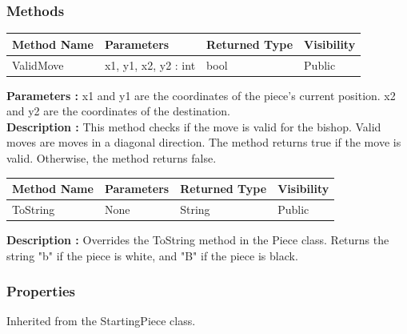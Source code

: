 \documentclass[12pt]{article}
\begin{document}
    \subsubsection{Methods}

    \begin{table}[H]
        \begin{tabular}{|l|l|l|l|}
            \hline
            \rowcolor[HTML]{EFEFEF}
            \cellcolor[HTML]{EFEFEF}\textbf{Method Name} & \textbf{Parameters}  & \textbf{Returned Type} & \textbf{Visibility} \\ \hline
            ValidMove                                    & x1, y1, x2, y2 : int & bool                   & Public              \\ \hline
        \end{tabular}
    \end{table}

    \textbf{Parameters :} x1 and y1 are the coordinates of the piece's current position.
    x2 and y2 are the coordinates of the destination.
    \\
    \textbf{Description :} This method checks if the move is valid for the bishop.
    Valid moves are moves in a diagonal direction.
    The method returns true if the move is valid.
    Otherwise, the method returns false.

    \begin{table}[H]
        \begin{tabular}{|l|l|l|l|}
            \hline
            \rowcolor[HTML]{EFEFEF}
            \cellcolor[HTML]{EFEFEF}\textbf{Method Name} & \textbf{Parameters} & \textbf{Returned Type} & \textbf{Visibility} \\ \hline
            ToString                                     & None                & String                 & Public              \\ \hline
        \end{tabular}
    \end{table}

    \textbf{Description :} Overrides the ToString method in the Piece class.
    Returns the string "b" if the piece is white, and "B" if the piece is black.

    \subsubsection{Properties}

    Inherited from the StartingPiece class.
\end{document}

